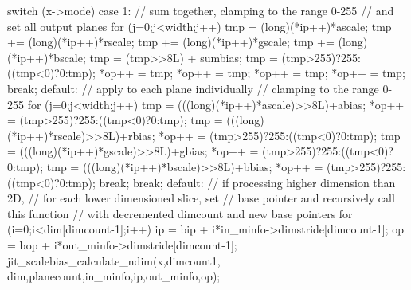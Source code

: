 \begin{DoxyCode}
{{{         switch (x->mode) {
         case 1:   
            // sum together, clamping to the range 0-255 
            // and set all output planes
            for (j=0;j<width;j++) {
               tmp  = (long)(*ip++)*ascale;
               tmp += (long)(*ip++)*rscale;
               tmp += (long)(*ip++)*gscale;
               tmp += (long)(*ip++)*bscale;
               tmp  = (tmp>>8L) + sumbias;
               tmp  = (tmp>255)?255:((tmp<0)?0:tmp);
               *op++ = tmp;
               *op++ = tmp;
               *op++ = tmp;
               *op++ = tmp;               
            }
            break;            
         default:   
            // apply to each plane individually 
            // clamping to the range 0-255
            for (j=0;j<width;j++) {
               tmp = (((long)(*ip++)*ascale)>>8L)+abias;
               *op++ = (tmp>255)?255:((tmp<0)?0:tmp);
               tmp = (((long)(*ip++)*rscale)>>8L)+rbias;
               *op++ = (tmp>255)?255:((tmp<0)?0:tmp);
               tmp = (((long)(*ip++)*gscale)>>8L)+gbias;
               *op++ = (tmp>255)?255:((tmp<0)?0:tmp);
               tmp = (((long)(*ip++)*bscale)>>8L)+bbias;
               *op++ = (tmp>255)?255:((tmp<0)?0:tmp);
            }
            break;
         }
      }
      break;
   default:
      // if processing higher dimension than 2D,
      // for each lower dimensioned slice, set 
      // base pointer and recursively call this function
      // with decremented dimcount and new base pointers 
      for   (i=0;i<dim[dimcount-1];i++) 
      {
         ip = bip + i*in_minfo->dimstride[dimcount-1];
         op = bop + i*out_minfo->dimstride[dimcount-1];
         jit_scalebias_calculate_ndim(x,dimcount1,
            dim,planecount,in_minfo,ip,out_minfo,op);
      }
   }
}
\end{DoxyCode}


